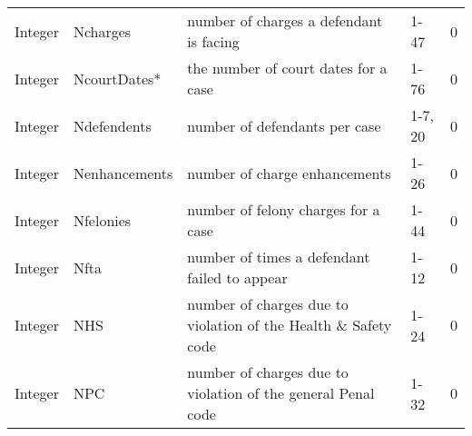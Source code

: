 \begin{table*}
\begin{tabular}{llp{8cm}p{5cm}l}
Integer     & Ncharges             & number of charges a defendant is facing                                                                 & 1-47                                                                                                                              & 0              \\
Integer     & NcourtDates*         & the number of court dates for a case                                                                    & 1-76                                                                                                                              & 0              \\
Integer     & Ndefendents          & number of defendants per case                                                                           & 1-7, 20                                                                                                                           & 0              \\
Integer     & Nenhancements        & number of charge enhancements                                                                           & 1-26                                                                                                                              & 0              \\
Integer     & Nfelonies            & number of felony charges for a case                                                                     & 1-44                                                                                                                              & 0              \\
Integer     & Nfta                 & number of times a defendant failed to appear                                                            & 1-12                                                                                                                              & 0              \\
Integer     & NHS                  & number of charges due to violation of the Health \& Safety code                                         & 1-24                                                                                                                              & 0              \\
Integer     & NPC                  & number of charges due to violation of the general Penal code                                            & 1-32                                                                                                                              & 0              \\

\end{tabular}
\end{table*}
